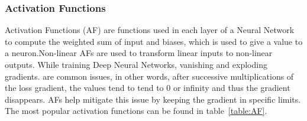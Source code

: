 \subsubsection{Activation Functions}

Activation Functions (AF) are functions used in each layer of a Neural Network
to compute the weighted sum of input and biases, which is used to give a value
to a neuron.Non-linear AFs are used to transform linear inputs to non-linear
outputs.  While training Deep Neural Networks, vanishing and exploding
gradients.  are common issues, in other words, after successive multiplications
of the loss gradient, the values tend to tend to 0 or infinity and thus the
gradient disappears.  AFs help mitigate this issue by keeping the gradient in
specific limits. The most popular activation functions can be found in
table~\ref{table:AF}.

\begin{table}[]
    \centering
    \resizebox{.6\textwidth}{!}{%
    \begin{tabular}{ll}
    \hline
    \textbf{Activation Functions} & \textbf{Computation Equation} \\ \hline \hline
    Sigmoid                       &  $\displaystyle f(x)=\frac{1}{1+ e^{-x}}$                             \\ \hline
    Tanh                          &  $\displaystyle f(x)=\frac{e^{x}-e^{-x}}{e^{x}+e^{-x}}$                            \\ \hline
    Softmax                       &  $\displaystyle f(x_{i})=\frac{x_{i}}{\sum_{j}e^{x_{j}}}$                             \\ \hline
    ReLU                          &    $ f(x)=\begin{matrix}
        x & if & x\geq 0  \\ 
        0 & if & x< 0 
    \end{matrix} $                           \\ \hline
    LReLU                         &  $f(x)= \begin{matrix}
        x & if & x > 0  \\ 
        \alpha x & if & x \leq 0 
    \end{matrix} $                        \\ \hline
    ELU                           &             $ f(x)=\begin{matrix}
        x & if & x> 0  \\ 
        \alpha e^{x} - 1 & if & x\leq 0 
    \end{matrix} $                 \\ \hline
    \end{tabular}%
    }
    \caption{Popular Activation functions}
    \label{table:AF}
\end{table}


